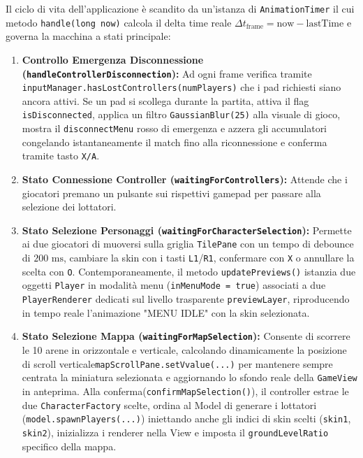\documentclass[11pt, a4paper]{article}
\begin{document}
	Il ciclo di vita dell'applicazione è scandito da un'istanza di \texttt{AnimationTimer} il cui metodo \texttt{handle(long now)} calcola il delta time reale $\Delta t_{\text{frame}} = \text{now} - \text{lastTime}$ e governa la macchina a stati principale:
	\begin{enumerate}
		\item \textbf{Controllo Emergenza Disconnessione (\texttt{handleControllerDisconnection}):} Ad ogni frame verifica tramite \texttt{inputManager.hasLostControllers(numPlayers)} che i pad richiesti siano ancora attivi. Se un pad si scollega durante la partita, attiva il flag \texttt{isDisconnected}, applica un filtro \texttt{GaussianBlur(25)} alla visuale di gioco, mostra il \texttt{disconnectMenu} rosso di emergenza e azzera gli accumulatori congelando istantaneamente il match fino alla riconnessione e conferma tramite tasto \texttt{X/A}.
		\item \textbf{Stato Connessione Controller (\texttt{waitingForControllers}):} Attende che i giocatori premano un pulsante sui rispettivi gamepad per passare alla selezione dei lottatori.
		\item \textbf{Stato Selezione Personaggi (\texttt{waitingForCharacterSelection}):} Permette ai due giocatori di muoversi sulla griglia \texttt{TilePane} con un tempo di debounce di $200\text{ ms}$, cambiare la skin con i tasti \texttt{L1}/\texttt{R1}, confermare con \texttt{X} o annullare la scelta con \texttt{O}. Contemporaneamente, il metodo \texttt{updatePreviews()} istanzia due oggetti \texttt{Player} in modalità menu (\texttt{inMenuMode = true}) associati a due \texttt{PlayerRenderer} dedicati sul livello trasparente \texttt{previewLayer}, riproducendo in tempo reale l'animazione "MENU IDLE" con la skin selezionata.
		\item \textbf{Stato Selezione Mappa (\texttt{waitingForMapSelection}):} Consente di scorrere le 10 arene in orizzontale e verticale, calcolando dinamicamente la posizione di scroll verticale\newline\texttt{mapScrollPane.setVvalue(...)} per mantenere sempre centrata la miniatura selezionata e aggiornando lo sfondo reale della \texttt{GameView} in anteprima. Alla conferma\newline(\texttt{confirmMapSelection()}), il controller estrae le due \texttt{CharacterFactory} scelte, ordina al Model di generare i lottatori (\texttt{model.spawnPlayers(...)}) iniettando anche gli indici di skin scelti (\texttt{skin1}, \texttt{skin2}), inizializza i renderer nella View e imposta il \texttt{groundLevelRatio} specifico della mappa.

\end{enumerate}
\end{document}
